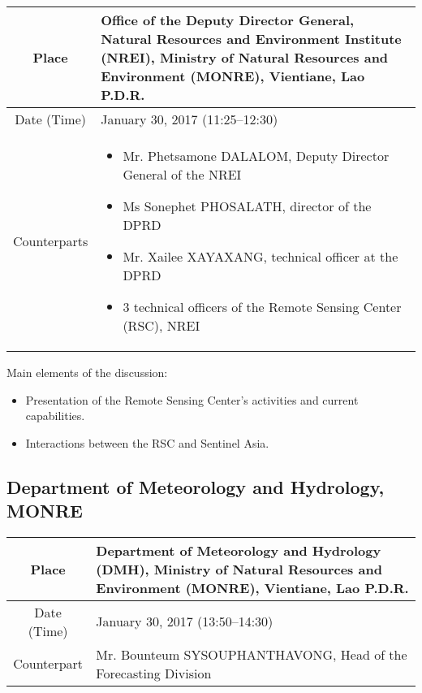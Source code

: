 \begin{table}[H]
   \centering
   \begin{tabular}{| c | p{12 cm} |}
   \hline
    Place & Office of the Deputy Director General, Natural Resources and Environment Institute (NREI), Ministry of Natural Resources and Environment (MONRE), Vientiane, Lao P.D.R. \\ \hline
    Date (Time) & January 30, 2017 (11:25--12:30) \\ \hline
    Counterparts & \begin{itemize} \item Mr. Phetsamone DALALOM, Deputy Director General of the NREI \item Ms Sonephet PHOSALATH, director of the DPRD \item Mr. Xailee XAYAXANG, technical officer at the DPRD \item 3 technical officers of the Remote Sensing Center (RSC), NREI \end{itemize} \\ \hline   
   \end{tabular}
\end{table}

Main elements of the discussion:

\begin{itemize}

\item Presentation of the Remote Sensing Center's activities and current capabilities.

\item Interactions between the RSC and Sentinel Asia.

\end{itemize}


\subsection{Department of Meteorology and Hydrology, MONRE}

\begin{table}[H]
   \centering
   \begin{tabular}{| c | p{12 cm} |}
   \hline
    Place & Department of Meteorology and Hydrology (DMH), Ministry of Natural Resources and Environment (MONRE), Vientiane, Lao P.D.R. \\ \hline
    Date (Time) & January 30, 2017 (13:50--14:30) \\ \hline
    Counterpart & Mr. Bounteum SYSOUPHANTHAVONG, Head of the Forecasting Division \\ \hline   
   \end{tabular}
\end{table}

